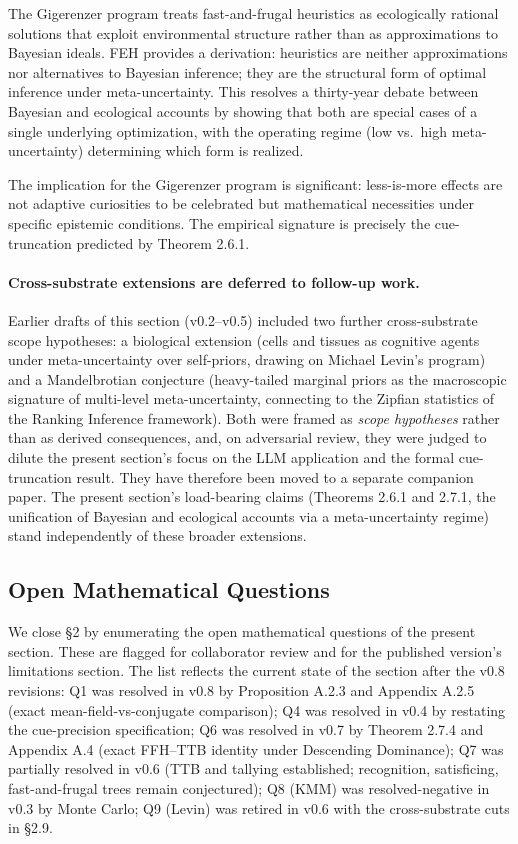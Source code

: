 \documentclass{article}
\begin{document}
The Gigerenzer program treats fast-and-frugal heuristics as ecologically
rational solutions that exploit environmental structure rather than as
approximations to Bayesian ideals. FEH provides a derivation: heuristics
are neither approximations nor alternatives to Bayesian inference; they
are the structural form of optimal inference under meta-uncertainty.
This resolves a thirty-year debate between Bayesian and ecological
accounts by showing that both are special cases of a single underlying
optimization, with the operating regime (low vs.~high meta-uncertainty)
determining which form is realized.

The implication for the Gigerenzer program is significant: less-is-more
effects are not adaptive curiosities to be celebrated but mathematical
necessities under specific epistemic conditions. The empirical signature
is precisely the cue-truncation predicted by Theorem 2.6.1.

\paragraph{Cross-substrate extensions are deferred to follow-up
work.}\label{cross-substrate-extensions-are-deferred-to-follow-up-work.}

Earlier drafts of this section (v0.2--v0.5) included two further
cross-substrate scope hypotheses: a biological extension (cells and
tissues as cognitive agents under meta-uncertainty over self-priors,
drawing on Michael Levin's program) and a Mandelbrotian conjecture
(heavy-tailed marginal priors as the macroscopic signature of
multi-level meta-uncertainty, connecting to the Zipfian statistics of
the Ranking Inference framework). Both were framed as \emph{scope
hypotheses} rather than as derived consequences, and, on adversarial
review, they were judged to dilute the present section's focus on the
LLM application and the formal cue-truncation result. They have
therefore been moved to a separate companion paper. The present
section's load-bearing claims (Theorems 2.6.1 and 2.7.1, the unification
of Bayesian and ecological accounts via a meta-uncertainty regime) stand
independently of these broader extensions.

\subsection{Open Mathematical
Questions}\label{open-mathematical-questions}

We close \S{}2 by enumerating the open mathematical questions of the
present section. These are flagged for collaborator review and for the
published version's limitations section. The list reflects the current
state of the section after the v0.8 revisions: Q1 was resolved in v0.8
by Proposition A.2.3 and Appendix A.2.5 (exact mean-field-vs-conjugate
comparison); Q4 was resolved in v0.4 by restating the cue-precision
specification; Q6 was resolved in v0.7 by Theorem 2.7.4 and Appendix A.4
(exact FFH--TTB identity under Descending Dominance); Q7 was partially
resolved in v0.6 (TTB and tallying established; recognition,
satisficing, fast-and-frugal trees remain conjectured); Q8 (KMM) was
resolved-negative in v0.3 by Monte Carlo; Q9 (Levin) was retired in v0.6
with the cross-substrate cuts in \S{}2.9.
\end{document}
